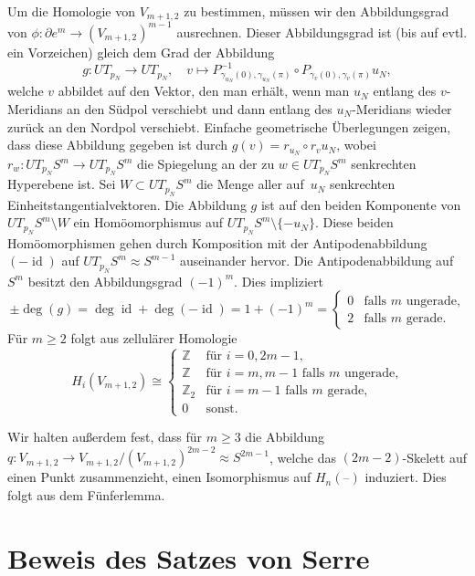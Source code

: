\documentclass[11pt, a4paper, german]{article}
\theoremstyle{definition}
\theoremstyle{remark}
\newcommand{\R}{\mathbb{R}} %
\newcommand{\Z}{\mathbb{Z}} %
\DeclareMathOperator{\id}{id} %
\newcommand{\blank}{\text{--}} %
\newcommand{\V}[2]{V_{{#2},{#1}}} %
\newcommand{\homeo}{\approx} %
\begin{document}
Um die Homologie von $\V{2}{m+1}$ zu bestimmen, müssen wir den Abbildungsgrad von $\phi : \partial e^m \to (\V{2}{m+1})^{m-1}$ ausrechnen.
Dieser Abbildungsgrad ist (bis auf evtl. ein Vorzeichen) gleich dem Grad der Abbildung
\[
  g : UT_{p_N} \to UT_{p_N}, \quad
  v \mapsto P_{\gamma_{u_N}(0),\gamma_{u_N}(\pi)}^{-1} \circ P_{\gamma_v(0),\gamma_v(\pi)} u_N,
\]
welche $v$ abbildet auf den Vektor, den man erhält, wenn man $u_N$ entlang des $v$-Meridians an den Südpol verschiebt und dann entlang des $u_N$-Meridians wieder zurück an den Nordpol verschiebt.
Einfache geometrische Überlegungen zeigen, dass diese Abbildung gegeben ist durch $g(v) = r_{u_N} \circ r_{v} u_N$, wobei $r_w : UT_{p_N} S^m \to UT_{p_N} S^m$ die Spiegelung an der zu $w \in UT_{p_N} S^m$ senkrechten Hyperebene ist.
Sei $W \subset UT_{p_N} S^m$ die Menge aller auf~$u_N$ senkrechten Einheitstangentialvektoren.
Die Abbildung $g$ ist auf den beiden Komponente von $UT_{p_N} S^m \setminus W$ ein Homöomorphismus auf $UT_{p_N} S^m \setminus \{ -u_N \}$.
Diese beiden Homöomorphismen gehen durch Komposition mit der Antipodenabbildung $(- \id)$ auf $UT_{p_N} S^m \homeo S^{m-1}$ auseinander hervor.
Die Antipodenabbildung auf~$S^m$ besitzt den Abbildungsgrad $(-1)^m$.
Dies impliziert
\[
  \pm \deg(g) = \deg \id + \deg (-\id) = 1 + (-1)^m = \begin{cases}
    0 & \text{falls $m$ ungerade,} \\
    2 & \text{falls $m$ gerade.}
  \end{cases}
\]
Für $m \geq 2$ folgt aus zellulärer Homologie
\[
  H_i(\V{2}{m+1}) \cong \begin{cases}
    \Z & \text{für } i = 0, 2m-1, \\
    \Z & \text{für } i = m, m-1 \text{ falls $m$ ungerade,} \\
    \Z_2 & \text{für } i = m-1 \text{ falls $m$ gerade,} \\
    0 & \text{sonst.}
  \end{cases}
\]

Wir halten außerdem fest, dass für $m \geq 3$ die Abbildung $q : \V{2}{m+1} \to \V{2}{m+1} / (\V{2}{m+1})^{2m-2} \homeo S^{2m-1}$, welche das $(2m-2)$-Skelett auf einen Punkt zusammenzieht, einen Isomorphismus auf $H_n(\blank)$ induziert.
Dies folgt aus dem Fünferlemma.

\section{Beweis des Satzes von Serre}
\end{document}
